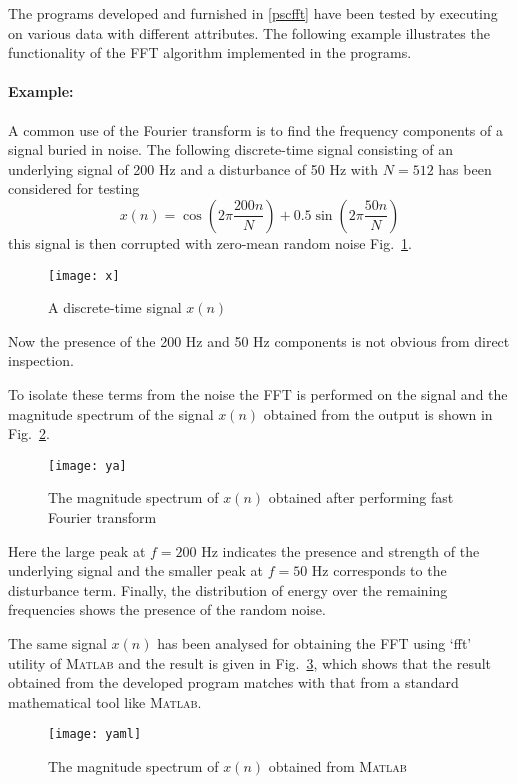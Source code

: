 \documentclass[a4paper,11pt]{article}
\begin{document}
The programs developed and furnished in \ref{pscfft} have been tested by executing on various data with different attributes. The following example illustrates the functionality of the FFT algorithm implemented in the programs.

\paragraph{Example:} A common use of the Fourier transform is to find the frequency components of a signal buried in noise. The following discrete-time signal consisting of an underlying signal of 200 Hz and a disturbance of 50 Hz with $N=512$ has been considered for testing \cite{schilling}
\begin{displaymath}
x(n) = \cos \left( 2\pi\frac{200n}{N}\right) +0.5\sin \left( 2\pi\frac{50n}{N} \right)
\end{displaymath}
this signal is then corrupted with zero-mean random noise Fig.~\ref{figx}. 

\begin{figure}[h]
\centering
\texttt{[image: x]}
\caption{A discrete-time signal $x(n)$} \label{figx}
\end{figure}

Now the presence of the 200 Hz and 50 Hz components is not obvious from direct inspection. 

To isolate these terms from the noise the FFT is performed on the signal and the magnitude spectrum of the signal $x(n)$ obtained from the output is shown in Fig.~\ref{figxms}. 

\begin{figure}[h]
\centering
\texttt{[image: ya]}
\caption{The magnitude spectrum of $x(n)$ obtained after performing fast Fourier transform} \label{figxms}
\end{figure}

Here the large peak at $f=200$ Hz indicates the presence and strength of the underlying signal and the smaller peak at $f=50$ Hz corresponds to the disturbance term. Finally, the distribution of energy over the remaining frequencies shows the presence of the random noise.

The same signal $x(n)$ has been analysed for obtaining the FFT using `fft' utility of \textsc{Matlab} and the result is given in Fig.~\ref{figxmsml}, which shows that the result obtained from the developed program matches with that from a standard mathematical tool like \textsc{Matlab}.

\begin{figure}[h]
\centering
\texttt{[image: yaml]}
\caption{The magnitude spectrum of $x(n)$ obtained from \textsc{Matlab}} \label{figxmsml}
\end{figure}
\end{document}
